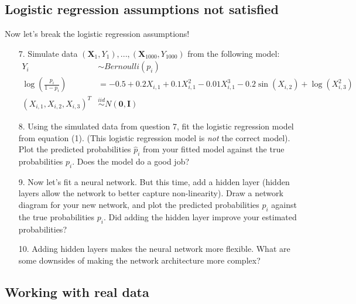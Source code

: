 \documentclass[11pt]{article}
\begin{document}
\newpage

\subsection*{Logistic regression assumptions not satisfied}

Now let's break the logistic regression assumptions! 

\begin{enumerate}
\item[7.] Simulate data $(\bm{X}_1, Y_1),...,(\bm{X}_{1000}, Y_{1000})$ from the following model:
\begin{align*}
Y_i &\sim Bernoulli(p_i) \\
\log \left( \frac{p_i}{1 - p_i} \right) &= -0.5 + 0.2 X_{i,1} + 0.1 X_{i,1}^2 - 0.01 X_{i,1}^3 - 0.2 \sin(X_{i,2}) + \log(X_{i,3}^2) \\
(X_{i,1}, X_{i,2}, X_{i,3})^T &\overset{iid}{\sim} N(\bm{0}, \bm{I})
\end{align*}

\item[8.] Using the simulated data from question 7, fit the logistic regression model from equation (1). (This logistic regression model is \textit{not} the correct model). Plot the predicted probabilities $\widehat{p}_i$ from your fitted model against the true probabilities $p_i$. Does the model do a good job?

\item[9.] Now let's fit a neural network. But this time, add a hidden layer (hidden layers allow the network to better capture non-linearity). Draw a network diagram for your new network, and plot the predicted probabilities $\widehat{p}_i$ against the true probabilities $p_i$. Did adding the hidden layer improve your estimated probabilities?

\item[10.] Adding hidden layers makes the neural network more flexible. What are some downsides of making the network architecture more complex?
\end{enumerate}

\subsection*{Working with real data}
\end{document}
